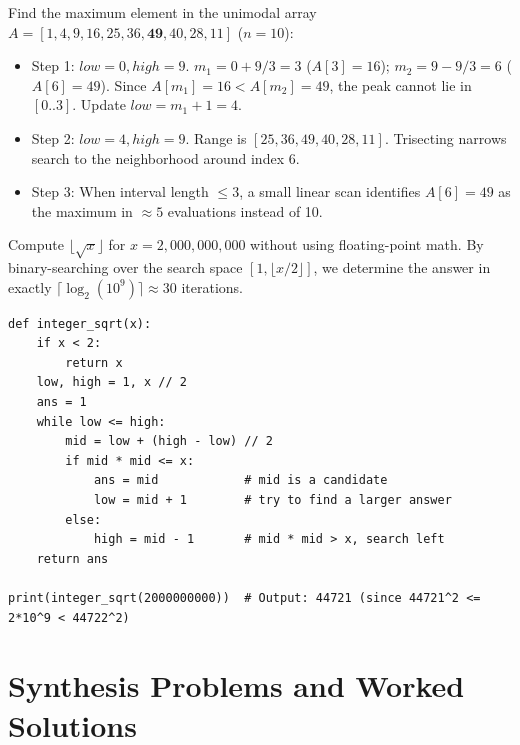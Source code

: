 \documentclass[11pt,a4paper]{article}
\begin{document}
\begin{examplebox}
Find the maximum element in the unimodal array $A = [1, 4, 9, 16, 25, 36, \mathbf{49}, 40, 28, 11]$ ($n = 10$):
\begin{itemize}[itemsep=2pt]
    \item Step 1: $low = 0, high = 9$. $m_1 = 0 + 9/3 = 3$ ($A[3]=16$); $m_2 = 9 - 9/3 = 6$ ($A[6]=49$).
    Since $A[m_1]=16 < A[m_2]=49$, the peak cannot lie in $[0..3]$. Update $low = m_1 + 1 = 4$.
    \item Step 2: $low = 4, high = 9$. Range is $[25, 36, 49, 40, 28, 11]$. Trisecting narrows search to the neighborhood around index 6.
    \item Step 3: When interval length $\le 3$, a small linear scan identifies $A[6] = 49$ as the maximum in $\approx 5$ evaluations instead of 10.
\end{itemize}
\end{examplebox}

\begin{examplebox}
Compute $\lfloor \sqrt{x} \rfloor$ for $x = 2,000,000,000$ without using floating-point math. By binary-searching over the search space $[1, \lfloor x/2 \rfloor]$, we determine the answer in exactly $\lceil \log_2(10^9) \rceil \approx 30$ iterations.
\end{examplebox}

\begin{lstlisting}[style=pythonstyle]
def integer_sqrt(x):
    if x < 2:
        return x
    low, high = 1, x // 2
    ans = 1
    while low <= high:
        mid = low + (high - low) // 2
        if mid * mid <= x:
            ans = mid            # mid is a candidate
            low = mid + 1        # try to find a larger answer
        else:
            high = mid - 1       # mid * mid > x, search left
    return ans

print(integer_sqrt(2000000000))  # Output: 44721 (since 44721^2 <= 2*10^9 < 44722^2)
\end{lstlisting}

\newpage
\section{Synthesis Problems and Worked Solutions}
\end{document}
